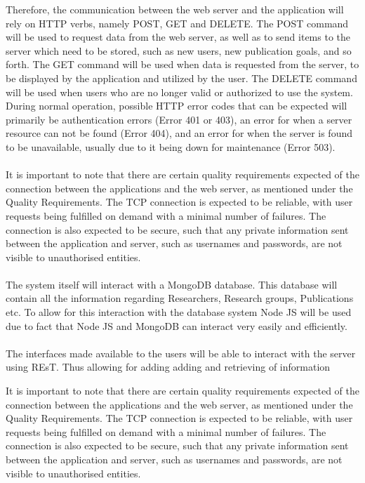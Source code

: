 \documentclass{article}
\begin{document}
	Therefore, the communication between the web server and the application will rely on HTTP verbs, namely POST, GET and DELETE. The POST command 
	will be used to request data from the web server, as well as to send items to the server which need to be stored, such as new users, new publication 
	goals, and so forth. The GET command will be used when data is requested from the server, to be displayed by the application and utilized by the user. 
	The DELETE command will be used when users who are no longer valid or authorized to use the system. During normal operation, possible HTTP error codes 
	that can be expected will primarily be authentication errors (Error 401 or 403), an error for when a server resource can not be found (Error 404), and an 
	error for when the server is found to be unavailable, usually due to it being down for maintenance (Error 503).\\ \\
	It is important to note that there are certain quality requirements expected of the connection between the applications and the web server, 
	as mentioned under the Quality Requirements. The TCP connection is expected to be reliable, with user requests being fulfilled on demand with a 
	minimal number of failures. The connection is also expected to be secure, such that any private information sent between the application and server, 
	such as usernames and passwords, are not visible to unauthorised entities.\\ \\
	The system itself will interact with a MongoDB database. This database will contain all the information regarding Researchers, Research groups, Publications etc.
	To allow for this interaction with the database system Node JS will be used due to fact that Node JS and MongoDB can interact very easily and efficiently.\\ \\
	The interfaces made available to the users will be able to interact with the server using REsT. Thus allowing for adding adding and retrieving of information
	
	It is important to note that there are certain quality requirements expected of the connection between the applications and the web server, as mentioned under the Quality Requirements. The TCP connection is expected to be reliable, with user requests being fulfilled on demand with a minimal number of failures. The connection is also expected to be secure, such that any private information sent between the application and server, such as usernames and passwords, are not visible to unauthorised entities.
\end{document}
